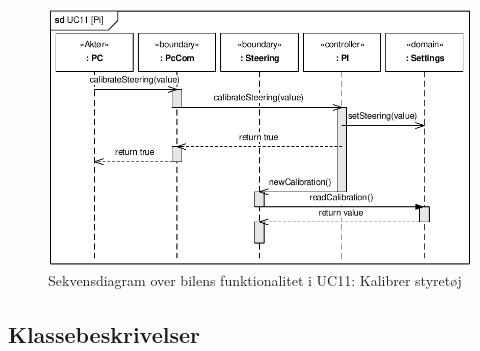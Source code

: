 \begin{figure}[h]
\centering
\includegraphics[]{../fig/diagrammer/bil/sd_uc11.pdf}
\caption{Sekvensdiagram over  bilens funktionalitet i UC11: Kalibrer styretøj}
\label{fig:sd_uc11_bil}
\end{figure}

\clearpage
\subsection{Klassebeskrivelser}
